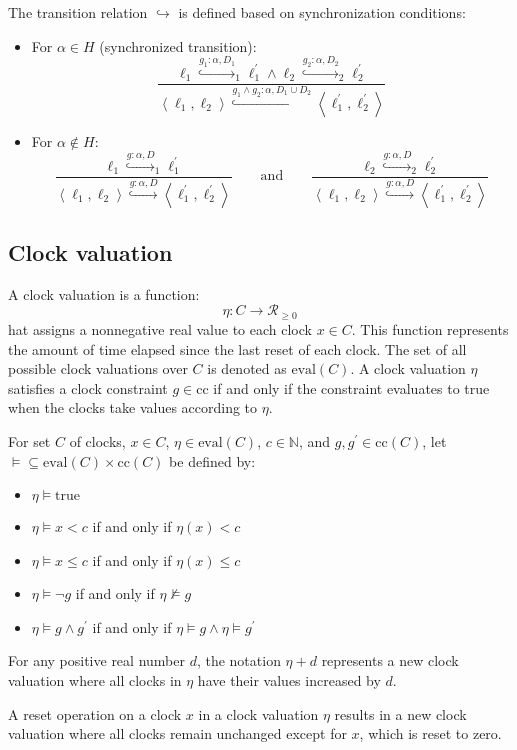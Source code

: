 The transition relation $\hookrightarrow$ is defined based on synchronization conditions:
\begin{itemize}
    \item For $\alpha \in H$ (synchronized transition): 
        \[\dfrac{\ell_1\overset{g_1:\alpha,D_1}{\hookrightarrow}_1\ell_1^\prime\land\ell_2\overset{g_2:\alpha,D_2}{\hookrightarrow}_2\ell_2^\prime}{\left\langle \ell_1,\ell_2\right\rangle\overset{g_1\land g_2:\alpha,D_1\cup D_2}{\hookrightarrow}\left\langle \ell_1^\prime,\ell_2^\prime\right\rangle}\]
        \item For $\alpha \notin H$: 
        \[\dfrac{\ell_1\overset{g:\alpha,D}{\hookrightarrow}_1\ell_1^\prime}{\left\langle \ell_1,\ell_2\right\rangle\overset{g:\alpha,D}{\hookrightarrow}\left\langle \ell_1^\prime,\ell_2^\prime\right\rangle} \qquad \text{and}\qquad\dfrac{\ell_2\overset{g:\alpha,D}{\hookrightarrow}_2\ell_2^\prime}{\left\langle \ell_1,\ell_2\right\rangle\overset{g:\alpha,D}{\hookrightarrow}\left\langle \ell_1^\prime,\ell_2^\prime\right\rangle}\]
\end{itemize}

\subsection{Clock valuation}
A clock valuation is a function:
\[\eta:C\rightarrow\mathcal{R}_{\geq 0}\]
hat assigns a nonnegative real value to each clock $x\in C$. 
This function represents the amount of time elapsed since the last reset of each clock.
The set of all possible clock valuations over $C$ is denoted as $\text{eval}(C)$.
A clock valuation $\eta$ satisfies a clock constraint $g\in\text{cc}$  if and only if the constraint evaluates to true when the clocks take values according to $\eta$.
\begin{definition}
    For set $C$ of clocks, $x\in C$, $\eta\in\text{eval}(C)$, $c\in\mathbb{N}$, and $g,g^\prime\in\text{cc}(C)$, let $\models\subseteq\text{eval}(C)\times\text{cc}(C)$ be defined by: 
    \begin{itemize}
        \item $\eta\models\text{true}$
        \item $\eta\models x<c$ if and only if $\eta(x)< c$
        \item $\eta\models x\leq c$ if and only if $\eta(x)\leq c$
        \item $\eta\models \lnot g$ if and only if $\eta\not\models g$
        \item $\eta\models g\land g^\prime$ if and only if $\eta\models g\land \eta\models g^\prime$
    \end{itemize}
\end{definition}
\noindent For any positive real number $d$, the notation $\eta+d$ represents a new clock valuation where all clocks in $\eta$ have their values increased by $d$.
\begin{definition} 
    A reset operation on a clock $x$ in a clock valuation $\eta$ results in a new clock valuation where all clocks remain unchanged except for $x$, which is reset to zero.
\end{definition}


